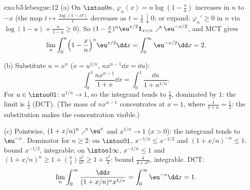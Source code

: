 \begin{solution}{exo:b3:lebesgue:12}
(a) On $\intoo0n$, $\varphi_n(x) = n\log(1 - \frac xn)$
increases in $n$ to $-x$ (the map $t \mapsto
\frac{\log(1 - xt)}{t}$ decreases as $t = \frac1n
\downarrow 0$; or expand: $\varphi_{n}' \geq 0$ in $n$ via
$\log(1-u) + \frac{u}{1-u} \geq 0$). So $(1 -
\frac xn)^n\eu^{x/2}\mathbf 1_{x<n} \nearrow
\eu^{-x/2}$, and MCT gives
\[
\lim_n\int_0^n\Bigl(1 - \frac xn\Bigr)^n\eu^{x/2}\dd x =
\int_0^\infty\eu^{-x/2}\dd x = 2 .
\]

(b) Substitute $u = x^n$ ($x = u^{1/n}$, $n x^{n-1}\dd x =
\dd u$):
\[
\int_0^1\frac{nx^{n-1}}{1 + x}\dd x =
\int_0^1\frac{\dd u}{1 + u^{1/n}} .
\]
For $u \in \intoo01$: $u^{1/n} \to 1$, so the integrand
tends to $\frac12$, dominated by $1$: the limit is
$\frac12$ (DCT). (The mass of $nx^{n-1}$ concentrates at $x
= 1$, where $\frac1{1+x} = \frac12$: the substitution makes
the concentration visible.)

(c) Pointwise, $(1 + x/n)^n \nearrow \eu^x$ and $x^{1/n} \to
1$ ($x > 0$): the integrand tends to $\eu^{-x}$. Dominator
for $n \geq 2$: on $\intoc01$, $x^{-1/n} \leq x^{-1/2}$ and
$(1 + x/n)^{-n} \leq 1$: bound $x^{-1/2}$, integrable; on
$\intoo1\infty$, $x^{-1/n} \leq 1$ and $(1 + x/n)^n \geq 1 +
\binom n2\frac{x^2}{n^2} \geq 1 + \frac{x^2}4$: bound
$\frac{4}{4 + x^2}$, integrable. DCT:
\[
\lim_n\int_0^\infty\frac{\dd x}{(1 + x/n)^nx^{1/n}} =
\int_0^\infty\eu^{-x}\dd x = 1 .
\]
\end{solution}

